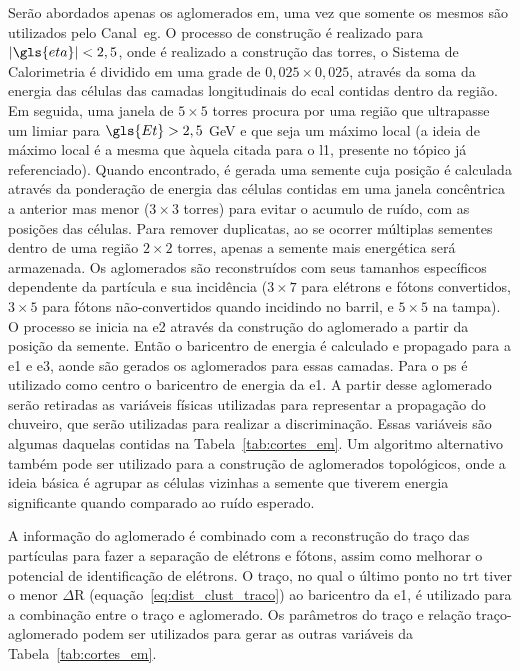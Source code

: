 Serão abordados apenas os aglomerados \gls{em}, uma vez que somente os mesmos são
utilizados pelo Canal~\gls{eg}. O processo de construção é realizado para 
$|\gls{eta}|<2,5$, onde é realizado a construção das torres, o Sistema de Calorimetria é 
dividido em uma grade de $0,025\times0,025$, através da soma da energia das
células das camadas longitudinais do \gls{ecal} contidas dentro da
região. Em seguida, uma janela de $5\times5$ torres
procura por uma região que ultrapasse um limiar para $\gls{Et} > 2,5$ GeV e 
que seja um máximo local (a ideia de máximo local é a mesma que àquela citada
para o \gls{l1}, presente no tópico já referenciado). Quando encontrado, é gerada uma
semente cuja posição é calculada através da ponderação de energia das células contidas 
em uma janela concêntrica a anterior mas menor ($3\times3$ torres) para evitar o
acumulo de ruído, com as posições das células.
Para remover duplicatas, ao se ocorrer múltiplas sementes dentro de uma região
$2\times2$ torres, apenas a semente mais energética será armazenada. Os
aglomerados são reconstruídos com seus tamanhos 
específicos dependente da partícula e sua incidência ($3\times7$ para elétrons e fótons convertidos,
$3\times5$ para fótons não-convertidos quando incidindo no barril, e $5\times5$ na
tampa). O processo se inicia na \gls{e2} através da construção do
aglomerado a partir da posição da semente. Então o baricentro de energia é
calculado e propagado para a \gls{e1} e \gls{e3}, aonde são gerados os
aglomerados para essas camadas. Para o \gls{ps} é utilizado como centro o
baricentro de energia da \gls{e1}. A partir desse aglomerado serão retiradas 
as variáveis físicas utilizadas para representar a propagação do chuveiro, que
serão utilizadas para realizar a discriminação. Essas variáveis são algumas
daquelas contidas na Tabela~\ref{tab:cortes_em}.  
Um algoritmo alternativo também pode ser utilizado para a construção
de aglomerados topológicos, onde a ideia básica é agrupar as células 
vizinhas a semente que tiverem energia significante quando comparado ao ruído
esperado.

A informação do aglomerado é combinado com a reconstrução do traço
\cite{physics_perf_expected} das partículas para fazer a separação de elétrons e fótons, assim como melhorar o
potencial de identificação de elétrons. O traço, no qual o último ponto no
\gls{trt} tiver o menor $\Delta\text{R}$ (equação~\ref{eq:dist_clust_traco}) ao baricentro da \gls{e1}, 
é utilizado para a combinação entre o traço e aglomerado. Os parâmetros do traço
e relação traço-aglomerado podem ser utilizados para gerar as outras variáveis
da Tabela~\ref{tab:cortes_em}.

